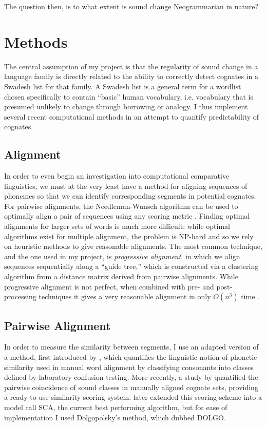 \documentclass[doc,natbib,11pt]{apa6}
\begin{document}
The question then, is to what extent is sound change Neogrammarian in nature? 

\section{Methods}

The central assumption of my project is that the regularity of sound change in a language family is directly related to the ability to correctly detect cognates in a Swadesh list for that family. A Swadesh list is a general term for a wordlist chosen specifically to contain ``basic'' human vocabulary, i.e. vocabulary that is presumed unlikely to change through borrowing or analogy\citep{Swadesh1950}. I thus implement several recent computational methods in an attempt to quantify predictability of cognates.

\subsection{Alignment}

In order to even begin an investigation into computational comparative linguistics, we must at the very least have a method for aligning sequences of phonemes so that we can identify corresponding segments in potential cognates. For pairwise alignments, the Needleman-Wunsch algorithm can be used to optimally align a pair of sequences using any scoring metric \citep{Needleman1970}. Finding optimal alignments for larger sets of words is much more difficult; while optimal algorithms exist for multiple alignment, the problem is NP-hard and so we rely on heuristic methods to give reasonable alignments. The most common technique, and the one used in my project, is \emph{progressive alignment}, in which we align sequences sequentially along a ``guide tree,'' which is constructed via a clustering algorithm from a distance matrix derived from pairwise alignments. While progressive alignment is not perfect, when combined with pre- and post-processing techniques it gives a very reasonable alignment in only $O(n^3)$ time \citep{Feng1987}. 

\subsection{Pairwise Alignment}

In order to measure the similarity between segments, I use an adapted version of a method, first introduced by \citet{Dolgopolsky1986}, which quantifies the linguistic notion of phonetic similarity used in manual word alignment by classifying consonants into classes defined by laboratory confusion testing. More recently, a study by \citet{Turchin2010} quantified the pairwise coincidence of sound classes in manually aligned cognate sets, providing a ready-to-use similarity scoring system. \citet{List2012a} later extended this scoring scheme into a model call SCA, the current best performing algorithm, but for ease of implementation I used Dolgopolsky's method, which dubbed DOLGO.
\end{document}
